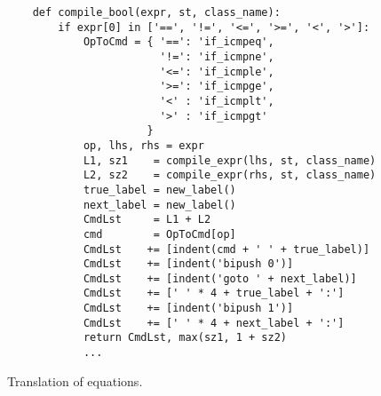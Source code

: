 \begin{figure}[!ht]
\centering
\begin{verbatim}
    def compile_bool(expr, st, class_name):
        if expr[0] in ['==', '!=', '<=', '>=', '<', '>']:
            OpToCmd = { '==': 'if_icmpeq', 
                        '!=': 'if_icmpne', 
                        '<=': 'if_icmple',
                        '>=': 'if_icmpge',
                        '<' : 'if_icmplt',
                        '>' : 'if_icmpgt'
                      }
            op, lhs, rhs = expr
            L1, sz1    = compile_expr(lhs, st, class_name)
            L2, sz2    = compile_expr(rhs, st, class_name)
            true_label = new_label()
            next_label = new_label()
            CmdLst     = L1 + L2
            cmd        = OpToCmd[op]
            CmdLst    += [indent(cmd + ' ' + true_label)]
            CmdLst    += [indent('bipush 0')]
            CmdLst    += [indent('goto ' + next_label)]
            CmdLst    += [' ' * 4 + true_label + ':']
            CmdLst    += [indent('bipush 1')]
            CmdLst    += [' ' * 4 + next_label + ':']
            return CmdLst, max(sz1, 1 + sz2)
            ...
\end{verbatim}
\vspace*{-0.3cm}
\caption{Translation of equations.}
\label{fig:Compiler.ipynb:compile:eq}
\end{figure}

